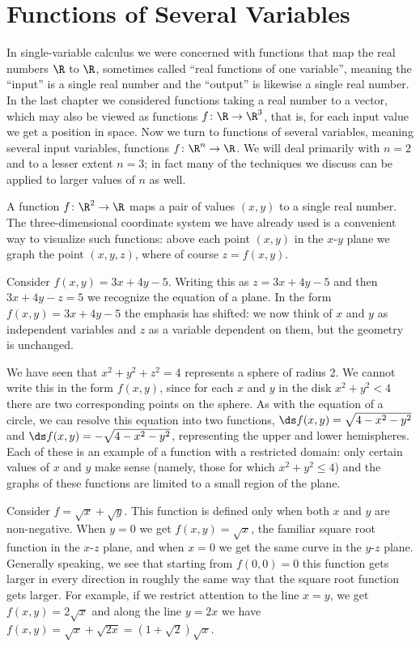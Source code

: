\section{Functions of Several Variables}{}{}

In single-variable calculus we were concerned with functions that map
the real numbers $\R$ to $\R$, sometimes called ``real functions of
one variable'', meaning the ``input'' is a single real number and the
``output'' is likewise a single real number. In the last chapter we
considered functions taking a real number to a vector, which may also
be viewed as functions $f\colon\R\to\R^3$, that is, for each input
value we get a position in space. Now we turn to functions of several
variables, meaning several input variables, functions
$f\colon\R^n\to\R$. We will deal primarily with $n=2$ and to a lesser
extent $n=3$; in fact many of the techniques we discuss can be applied
to larger values of $n$ as well.

A function $f\colon\R^2\to\R$ maps a pair of values $(x,y)$ to a
single real number. The three-dimensional coordinate system we have
already used is a convenient way to visualize such functions: above
each point $(x,y)$ in the $x$-$y$ plane we graph the point $(x,y,z)$,
where of course $z=f(x,y)$. 

\begin{example} Consider $f(x,y)=3x+4y-5$. Writing this as 
$z=3x+4y-5$ and then $3x+4y-z=5$ we recognize the equation of a
plane. In the form $f(x,y)=3x+4y-5$ the emphasis has shifted: we now
think of $x$ and $y$ as independent variables and $z$ as a variable
dependent on them, but the geometry is unchanged.
\end{example}

\begin{example} We have seen that $x^2+y^2+z^2=4$ represents a sphere of radius
2. We cannot write this in the form $f(x,y)$, since for
each $x$ and $y$ in the disk $x^2+y^2<4$ there are two corresponding
points on the sphere. As with the equation of a circle, we can resolve
this equation into two functions, $\ds f(x,y)=\sqrt{4-x^2-y^2}$ and 
$\ds f(x,y)=-\sqrt{4-x^2-y^2}$, representing the upper and lower
hemispheres. Each of these is an example of a function with a
restricted domain: only certain values of $x$ and $y$ make sense
(namely, those for which $x^2+y^2\le 4$) and the graphs of these
functions are limited to a small region of the plane.
\end{example}

\begin{example} Consider $f=\sqrt x+\sqrt y$. This function is defined only when
both $x$ and $y$ are non-negative. When $y=0$ we get $f(x,y)=\sqrt x$,
the familiar square root function in the $x$-$z$ plane, and when $x=0$
we get the same curve in the $y$-$z$ plane. Generally speaking, we see
that starting from $f(0,0)=0$ this function gets larger in every direction
in roughly the same way that the square root function gets
larger. For example, if we restrict attention to the line $x=y$, we
get $f(x,y)=2\sqrt x$ and along the line $y=2x$ we have $f(x,y)=\sqrt
x+\sqrt{2x}=(1+\sqrt2)\sqrt x$.
\end{example}

